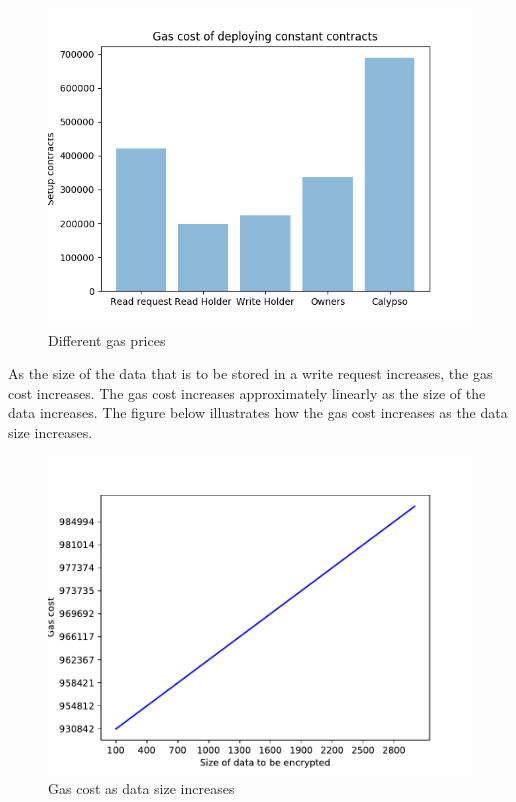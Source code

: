 \documentclass[12pt]{article}
\begin{document}
\begin{figure}[H]
    \centering
    \includegraphics[width=1\textwidth]{ConstantGasCost.png}
    \caption{Different gas prices}
    \label{fig:contractsGasprices}
\end{figure}

As the size of the data that is to be stored in a write request increases, the gas cost increases. The gas cost increases approximately linearly as the size of the data increases. The figure below illustrates how the gas cost increases as the data size increases. 

\begin{figure}[H]
    \centering
    \includegraphics[width=1\textwidth]{WriteGasData.pdf}
    \caption{Gas cost as data size increases}
    \label{fig:contractsGasprices}
\end{figure}
\end{document}
